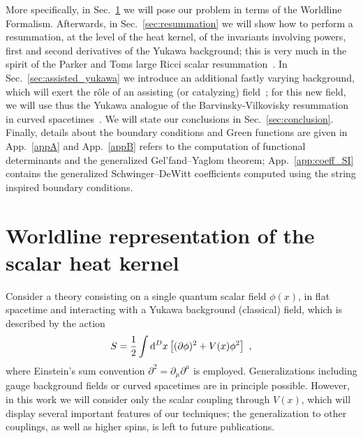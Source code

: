 \documentclass[12pt,a4paper]{article}
\numberwithin{equation}{section}
\numberwithin{equation}{section}
\begin{document}
More specifically, in Sec.~\ref{sec1} we will pose our problem in terms of the Worldline Formalism.
Afterwards, in Sec.~\ref{sec:resummation} we will show how to perform a resummation, at the level of the heat kernel, of the invariants involving powers, first and second derivatives of the Yukawa background; this is very much in the spirit of the Parker and Toms large Ricci scalar resummation~\cite{Parker:1984dj,Hu:1984js,Jack:1985mw,Flachi:2015sva}. In Sec.~\ref{sec:assisted_yukawa} we introduce an additional fastly varying background, which will exert the rôle of an assisting (or catalyzing) field~\cite{Schutzhold:2008pz}; for this new field, we will use thus the Yukawa analogue of the Barvinsky-Vilkovisky resummation in curved spacetimes~\cite{Barvinsky:1987uw, Barvinsky:1990up, Silva:2023lts}. We will state our conclusions in Sec.~\ref{sec:conclusion}. Finally, details about the boundary conditions and Green functions are given in App.~\ref{appA} and App.~\ref{appB} refers to the computation of functional determinants and the generalized Gel'fand--Yaglom theorem; App.~\ref{app:coeff_SI} contains the generalized Schwinger--DeWitt coefficients computed using the string inspired boundary conditions.


\section{Worldline representation of the scalar heat kernel} \label{sec1}
Consider a theory consisting on a single quantum scalar field $\phi(x)$, in flat spacetime and interacting with a Yukawa background (classical) field, which is described by the action
\begin{equation}
S=\frac12 \int {\rm d}^Dx \left[ (\partial \phi)^2 + V(x) \phi^2\right]\ ,
\end{equation}
where Einstein’s sum convention $\partial^2=\partial_\mu \partial^\mu$ is employed. 
Generalizations including gauge background fields or curved spacetimes are in principle possible. However, in this work we will consider only the scalar coupling through $V(x)$, which will display several important features of our techniques; the generalization to other couplings, as well as higher spins, is left to future publications. 
\end{document}
